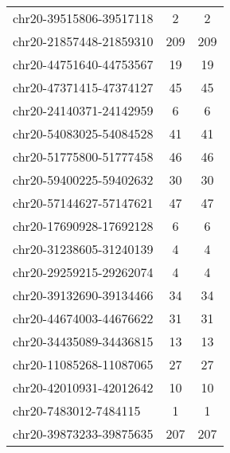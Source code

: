 \begin{longtable}{lSS}
	chr20-39515806-39517118 & 2      & 2                                   \\
	chr20-21857448-21859310 & 209    & 209                                 \\
	chr20-44751640-44753567 & 19     & 19                                  \\
	chr20-47371415-47374127 & 45     & 45                                  \\
	chr20-24140371-24142959 & 6      & 6                                   \\
	chr20-54083025-54084528 & 41     & 41                                  \\
	chr20-51775800-51777458 & 46     & 46                                  \\
	chr20-59400225-59402632 & 30     & 30                                  \\
	chr20-57144627-57147621 & 47     & 47                                  \\
	chr20-17690928-17692128 & 6      & 6                                   \\
	chr20-31238605-31240139 & 4      & 4                                   \\
	chr20-29259215-29262074 & 4      & 4                                   \\
	chr20-39132690-39134466 & 34     & 34                                  \\
	chr20-44674003-44676622 & 31     & 31                                  \\
	chr20-34435089-34436815 & 13     & 13                                  \\
	chr20-11085268-11087065 & 27     & 27                                  \\
	chr20-42010931-42012642 & 10     & 10                                  \\
	chr20-7483012-7484115   & 1      & 1                                   \\
	chr20-39873233-39875635 & 207    & 207                                 \\
\end{longtable}


